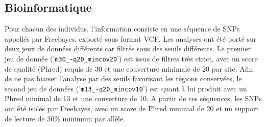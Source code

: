 \documentclass[12pt,a4paper,notitlepage]{article}
\begin{document}

\subsection{Bioinformatique}

Pour chacun des individus, l'information consiste en une séquence de SNPs appellés par Freebayes, exporté sous format VCF. Les analyses ont été porté sur deux jeux de données différents car filtrés sous des seuils différents.
Le premier jeu de donnée ('\verb|m30_-q20_mincov20|') est issus de filtres très strict, avec un score de qualité (Phred) requis de 30 et une couverture minimale de 20 par site. Afin de ne pas biaiser l'analyse par des seuils favorisant les régions conservées, le second jeu de données ('\verb|m13_-q20_mincov10|') est quant à lui produit avec un Phred minimal de 13 et une couverture de 10. A partir de ces séquences, les SNPs ont été isolés par Freebayes, avec un score de Phred minimal de 20 et un support de lecture de 30\% minimum par allèle.
\end{document}
